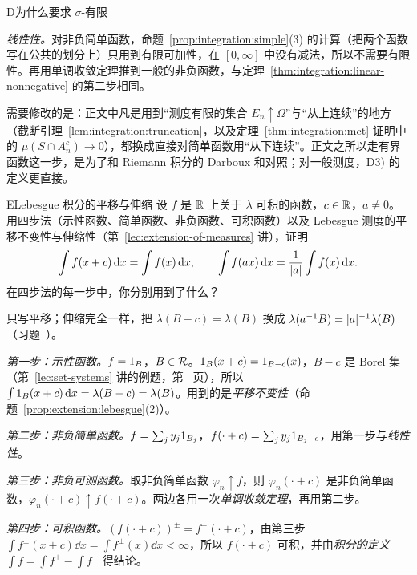 \begin{probleme}[问题]{D}{为什么要求 \texorpdfstring{$\sigma$}{σ}-有限}
\begin{questions}
\begin{solution}
\emph{线性性。}对非负简单函数，命题~\ref{prop:integration:simple}(3) 的计算（把两个函数写在公共的划分上）只用到有限可加性，在 $[0,\infty]$ 中没有减法，所以不需要有限性。再用单调收敛定理推到一般的非负函数，与定理~\ref{thm:integration:linear-nonnegative} 的第二步相同。

需要修改的是：正文中凡是用到“测度有限的集合 $E_n\uparrow\Omega$”与“从上连续”的地方（截断引理~\ref{lem:integration:truncation}，以及定理~\ref{thm:integration:mct} 证明中的 $\mu(S\cap A_n^c)\to0$），都换成直接对简单函数用“从下连续”。正文之所以走有界函数这一步，是为了和 Riemann 积分的 Darboux 和对照；对一般测度，D3) 的定义更直接。
\end{solution}
\end{questions}
\end{probleme}

\begin{probleme}[问题]{E}{Lebesgue 积分的平移与伸缩}
设 $f$ 是 $\mathbb{R}$ 上关于 $\lambda$ 可积的函数，$c\in\mathbb{R}$，$a\neq0$。用四步法（示性函数、简单函数、非负函数、可积函数）以及 Lebesgue 测度的平移不变性与伸缩性（第~\ref{lec:extension-of-measures} 讲），证明
\[
\int f(x+c)\,\mathrm{d} x=\int f(x)\,\mathrm{d} x,\qquad\int f(ax)\,\mathrm{d} x=\frac1{\lvert a\rvert}\int f(x)\,\mathrm{d} x .
\]
在四步法的每一步中，你分别用到了什么？
\begin{solution}
只写平移；伸缩完全一样，把 $\lambda(B-c)=\lambda(B)$ 换成 $\lambda(a^{-1}B)=\lvert a\rvert^{-1}\lambda(B)$（习题~）。

\emph{第一步：示性函数。}$f=1_B$，$B\in\mathcal{R}$。$1_B(x+c)=1_{B-c}(x)$，$B-c$ 是 Borel 集（第~\ref{lec:set-systems} 讲的例题，第~\pageref{we:set-systems:translation} 页），所以 $\int1_B(x+c)\,\mathrm{d} x=\lambda(B-c)=\lambda(B)$。用到的是\emph{平移不变性}（命题~\ref{prop:extension:lebesgue}(2)）。

\emph{第二步：非负简单函数。}$f=\sum_jy_j1_{B_j}$，$f(\cdot+c)=\sum_jy_j1_{B_j-c}$，用第一步与\emph{线性性}。

\emph{第三步：非负可测函数。}取非负简单函数 $\varphi_n\uparrow f$，则 $\varphi_n(\cdot+c)$ 是非负简单函数，$\varphi_n(\cdot+c)\uparrow f(\cdot+c)$。两边各用一次\emph{单调收敛定理}，再用第二步。

\emph{第四步：可积函数。}$(f(\cdot+c))^\pm=f^\pm(\cdot+c)$，由第三步 $\int f^\pm(x+c)\dd x=\int f^\pm(x)\dd x<\infty$，所以 $f(\cdot+c)$ 可积，并由\emph{积分的定义} $\int f=\int f^+-\int f^-$ 得结论。
\end{solution}
\end{probleme}


